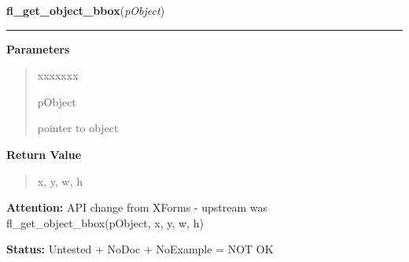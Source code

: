 \hspace{.8\funcindent}\begin{boxedminipage}{\funcwidth}

    \raggedright \textbf{fl\_get\_object\_bbox}(\textit{pObject})

    \vspace{-1.5ex}

    \rule{\textwidth}{0.5\fboxrule}
\setlength{\parskip}{2ex}
\setlength{\parskip}{1ex}
      \textbf{Parameters}
      \vspace{-1ex}

      \begin{quote}
        \begin{Ventry}{xxxxxxx}

          \item[pObject]

          pointer to object

        \end{Ventry}

      \end{quote}

      \textbf{Return Value}
    \vspace{-1ex}

      \begin{quote}
      x, y, w, h

      \end{quote}

\textbf{Attention:} API change from XForms - upstream was fl\_get\_object\_bbox(pObject, x, y, 
w, h)



\textbf{Status:} Untested + NoDoc + NoExample = NOT OK



    \end{boxedminipage}

    \label{xformslib:library:fl_get_object_bbox}

    \vspace{0.5ex}


